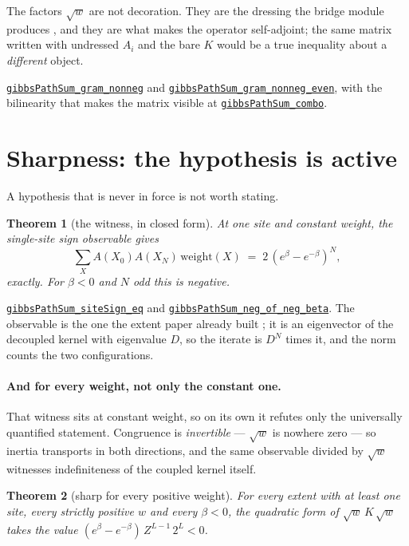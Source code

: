 \documentclass[11pt]{article}
\newtheorem{theorem}{Theorem}[section]
\theoremstyle{definition}
\newcommand{\anchor}{854ff223396630a8a75b0a95a3ada6413f3a395d}
\newcommand{\osline}[3]{%
  \href{https://github.com/lluiseriksson/THE-ERIKSSON-PROGRAMME/blob/\anchor/YangMills/OS/#1.lean\#L#2}{\nolinkurl{#3}}}
\begin{document}
The factors $\sqrt{w}$ are not decoration.  They are the dressing the bridge
module produces \cite{ErikssonGibbs}, and they are what makes the operator
self-adjoint; the same matrix written with undressed $A_i$ and the bare $K$
would be a true inequality about a \emph{different} object.

\osline{SpatialReflection}{485}{gibbsPathSum\_gram\_nonneg} and
\osline{SpatialReflection}{492}{gibbsPathSum\_gram\_nonneg\_even}, with
the bilinearity that makes the matrix visible at
\osline{SpatialReflection}{460}{gibbsPathSum\_combo}.

\section{Sharpness: the hypothesis is active}\label{sec:sharp}

A hypothesis that is never in force is not worth stating.

\begin{theorem}[the witness, in closed form]\label{thm:witness}
At one site and constant weight, the single-site sign observable gives
\[
  \sum_X A(X_0)A(X_N)\,\text{weight}(X)
  \;=\; 2\,(e^{\beta}-e^{-\beta})^{N} ,
\]
exactly.  For $\beta<0$ and $N$ odd this is negative.
\end{theorem}

\osline{SpatialReflection}{308}{gibbsPathSum\_siteSign\_eq} and
\osline{SpatialReflection}{330}{gibbsPathSum\_neg\_of\_neg\_beta}.
The observable is the one the extent paper already built
\cite{ErikssonExtent}; it is an eigenvector of the decoupled kernel with
eigenvalue $D$, so the iterate is $D^{N}$ times it, and the norm counts the two
configurations.

\paragraph{And for every weight, not only the constant one.}  That witness sits
at constant weight, so on its own it refutes only the universally quantified
statement.  Congruence is \emph{invertible} --- $\sqrt{w}$ is nowhere zero ---
so inertia transports in both directions, and the same observable divided by
$\sqrt{w}$ witnesses indefiniteness of the coupled kernel itself.

\begin{theorem}[sharp for every positive weight]\label{thm:sharpw}
For every extent with at least one site, every strictly positive $w$ and every
$\beta<0$, the quadratic form of $\sqrt{w}\,K\,\sqrt{w}$ takes the value
$(e^{\beta}-e^{-\beta})\,Z^{L-1}\,2^{L} < 0$.
\end{theorem}
\end{document}
